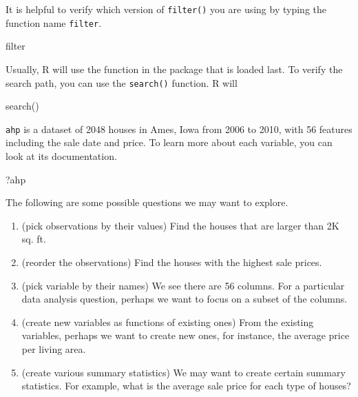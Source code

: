 \documentclass[
]{book}
\newenvironment{Shaded}{\begin{snugshade}}{\end{snugshade}}
\newcommand{\FunctionTok}[1]{\textcolor[rgb]{0.00,0.00,0.00}{#1}}
\newcommand{\NormalTok}[1]{#1}
\begin{document}
It is helpful to verify which version of \texttt{filter()} you are using by typing the function name \texttt{filter}.

\begin{Shaded}
\begin{Highlighting}[]
\NormalTok{filter}
\end{Highlighting}
\end{Shaded}

Usually, R will use the function in the package that is loaded last. To verify the search path, you can use the \texttt{search()} function. R will

\begin{Shaded}
\begin{Highlighting}[]
\FunctionTok{search}\NormalTok{()}
\end{Highlighting}
\end{Shaded}

\texttt{ahp} is a dataset of 2048 houses in Ames, Iowa from 2006 to 2010, with 56 features including the sale date and price. To learn more about each variable, you can look at its documentation.

\begin{Shaded}
\begin{Highlighting}[]
\NormalTok{?ahp}
\end{Highlighting}
\end{Shaded}

The following are some possible questions we may want to explore.

\begin{enumerate}
\def\labelenumi{\arabic{enumi}.}
\item
  (pick observations by their values) Find the houses that are larger than 2K sq. ft.
\item
  (reorder the observations) Find the houses with the highest sale prices.
\item
  (pick variable by their names) We see there are 56 columns. For a particular data analysis question, perhaps we want to focus on a subset of the columns.
\item
  (create new variables as functions of existing ones) From the existing variables, perhaps we want to create new ones, for instance, the average price per living area.
\item
  (create various summary statistics) We may want to create certain summary statistics. For example, what is the average sale price for each type of houses?
\end{enumerate}
\end{document}
